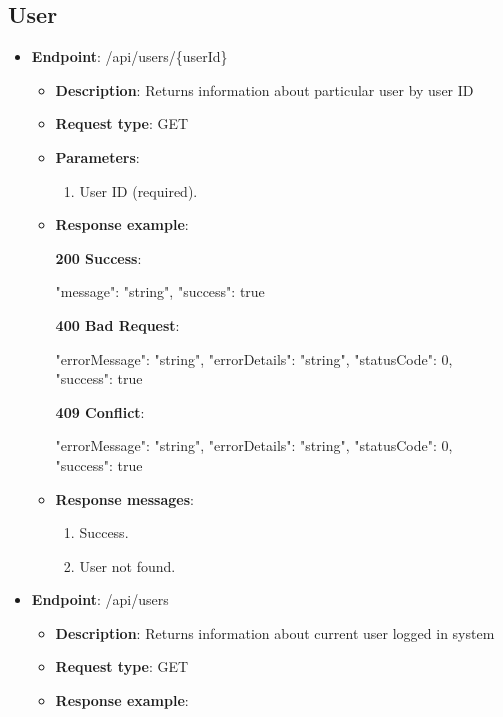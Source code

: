 \subsection{User}\label{subsec:user}
\begin{itemize}
    \item \textbf{Endpoint}: /api/users/\{userId\}
    \begin{itemize}
        \item \textbf{Description}: Returns information about particular user by user ID
        \item \textbf{Request type}: GET
        \item \textbf{Parameters}:
        \begin{enumerate}
            \item User ID (required).
        \end{enumerate}
        \item \textbf{Response example}:

        \textbf{200 Success}:

        \begin{spverbatim}
        {
            "message": "string",
            "success": true
        }
        \end{spverbatim}

        \textbf{400 Bad Request}:

        \begin{spverbatim}
        {
            "errorMessage": "string",
            "errorDetails": "string",
            "statusCode": 0,
            "success": true
        }
        \end{spverbatim}

        \textbf{409 Conflict}:

        \begin{spverbatim}
        {
            "errorMessage": "string",
            "errorDetails": "string",
            "statusCode": 0,
            "success": true
        }
        \end{spverbatim}

        \item \textbf{Response messages}:
        \begin{enumerate}
            \item Success.
            \item User not found.
        \end{enumerate}
    \end{itemize}
    \item \textbf{Endpoint}: /api/users
    \begin{itemize}
        \item \textbf{Description}: Returns information about current user logged in system
        \item \textbf{Request type}: GET
        \item \textbf{Response example}:


\end{itemize}
\end{itemize}
